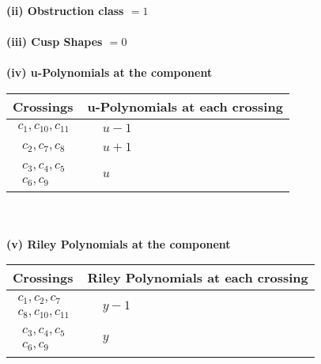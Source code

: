 \documentclass[1p]{elsarticle_modified}
\theoremstyle{definition}
\begin{document}
\flushleft \textbf{(ii) Obstruction class $= 1$}\\~\\
\flushleft \textbf{(iii) Cusp Shapes $= 0$}\\~\\
\newpage\renewcommand{\arraystretch}{1}
\flushleft \textbf{(iv) u-Polynomials at the component}\newline \\
\begin{tabular}{m{50pt}|m{274pt}}
Crossings & \hspace{64pt}u-Polynomials at each crossing \\
\hline $$\begin{aligned}c_{1},c_{10},c_{11}\end{aligned}$$&$\begin{aligned}
&u-1
\end{aligned}$\\
\hline $$\begin{aligned}c_{2},c_{7},c_{8}\end{aligned}$$&$\begin{aligned}
&u+1
\end{aligned}$\\
\hline $$\begin{aligned}c_{3},c_{4},c_{5}\\c_{6},c_{9}\end{aligned}$$&$\begin{aligned}
&u
\end{aligned}$\\
\hline
\end{tabular}\\~\\
\newpage\renewcommand{\arraystretch}{1}
\flushleft \textbf{(v) Riley Polynomials at the component}\newline \\
\begin{tabular}{m{50pt}|m{274pt}}
Crossings & \hspace{64pt}Riley Polynomials at each crossing \\
\hline $$\begin{aligned}c_{1},c_{2},c_{7}\\c_{8},c_{10},c_{11}\end{aligned}$$&$\begin{aligned}
&y-1
\end{aligned}$\\
\hline $$\begin{aligned}c_{3},c_{4},c_{5}\\c_{6},c_{9}\end{aligned}$$&$\begin{aligned}
&y
\end{aligned}$\\
\hline
\end{tabular}\\~\\
\end{document}

